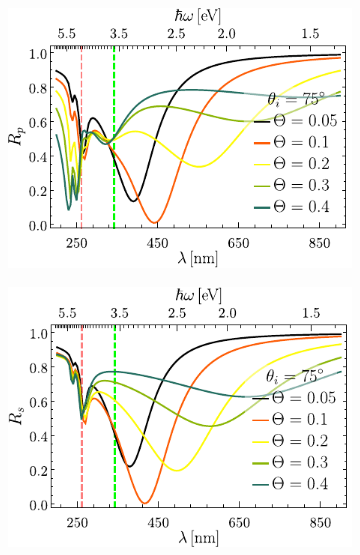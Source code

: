 \begin{figure}[h!]\centering\hspace*{-1.5em}
	\begin{subfigure}{.01\linewidth}\caption{}\label{sfig:R-ATR10-cutp}\vspace{4.5cm}\end{subfigure}
	\begin{subfigure}{.45\linewidth}\hspace*{-1.5em}
	\includegraphics[scale=1]{2-Resultados/figs/2-Wp10ThetaVar/cut_angle_75_p.pdf}\end{subfigure}
	\begin{subfigure}{.01\linewidth}\caption{}\label{sfig:R-ATR10-cuts}\vspace{4.5cm}\end{subfigure}\hspace*{-1.em}
	\begin{subfigure}{.45\linewidth}\centering
	\includegraphics[scale=1 ]{2-Resultados/figs/2-Wp10ThetaVar/cut_angle_75_s.pdf}\end{subfigure}\vspace*{-.5em}

\end{figure}
